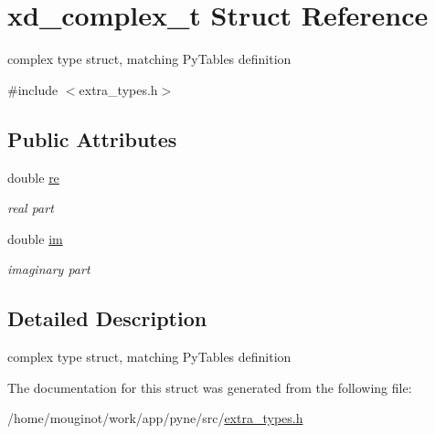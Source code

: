 \hypertarget{structxd__complex__t}{}\section{xd\+\_\+complex\+\_\+t Struct Reference}
\label{structxd__complex__t}


complex type struct, matching Py\+Tables definition  




{\ttfamily \#include $<$extra\+\_\+types.\+h$>$}

\subsection*{Public Attributes}
\begin{DoxyCompactItemize}
\item 
\mbox{\label{structxd__complex__t_afbbb6ed1fe3b729258421cb3eaa8c4d8}} 
double \hyperlink{structxd__complex__t_afbbb6ed1fe3b729258421cb3eaa8c4d8}{re}
\begin{DoxyCompactList}\small\item\em real part \end{DoxyCompactList}\item 
\mbox{\label{structxd__complex__t_afb1d09ccfa0e10044572c8a7bf4806f2}} 
double \hyperlink{structxd__complex__t_afb1d09ccfa0e10044572c8a7bf4806f2}{im}
\begin{DoxyCompactList}\small\item\em imaginary part \end{DoxyCompactList}\end{DoxyCompactItemize}


\subsection{Detailed Description}
complex type struct, matching Py\+Tables definition 

The documentation for this struct was generated from the following file\+:\begin{DoxyCompactItemize}
\item 
/home/mouginot/work/app/pyne/src/\hyperlink{extra__types_8h}{extra\+\_\+types.\+h}\end{DoxyCompactItemize}
